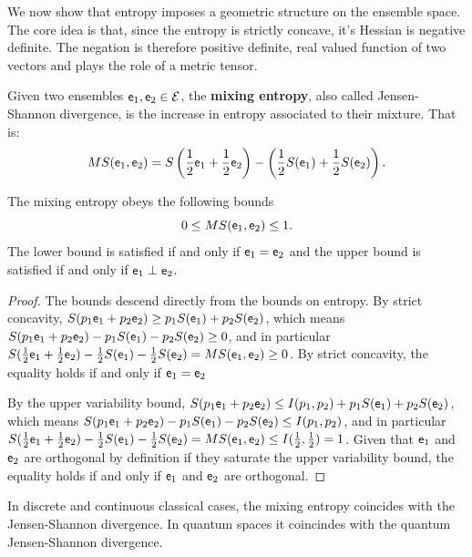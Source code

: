 We now show that entropy imposes a geometric structure on the ensemble space. The core idea is that, since the entropy is strictly concave, it's Hessian is negative definite. The negation is therefore positive definite, real valued function of two vectors and plays the role of a metric tensor.

\begin{defn}
	Given two ensembles $\mathsf{e}_1, \mathsf{e}_2 \in \mathcal{E}$, the \textbf{mixing entropy}, also called Jensen-Shannon divergence, is the increase in entropy associated to their mixture. That is:
	$$MS(\mathsf{e}_1, \mathsf{e}_2) = S\left(\frac{1}{2}\mathsf{e}_1 + \frac{1}{2} \mathsf{e}_2\right) - \left(\frac{1}{2} S(\mathsf{e}_1) + \frac{1}{2} S(\mathsf{e}_2)\right).$$
\end{defn}

\begin{coro}
	The mixing entropy obeys the following bounds
	$$ 0 \leq MS(\mathsf{e}_1, \mathsf{e}_2) \leq 1.$$
	The lower bound is satisfied if and only if $\mathsf{e}_1 = \mathsf{e}_2$ and the upper bound is satisfied if and only if $\mathsf{e}_1 \perp \mathsf{e}_2$.
\end{coro}

\begin{proof}
	The bounds descend directly from the bounds on entropy. By strict concavity, $S(p_1\mathsf{e}_1 + p_2 \mathsf{e}_2) \geq p_1 S(\mathsf{e}_1) + p_2 S(\mathsf{e}_2)$, which means $S(p_1\mathsf{e}_1 + p_2 \mathsf{e}_2) - p_1 S(\mathsf{e}_1) - p_2 S(\mathsf{e}_2) \geq 0$, and in particular $S(\frac{1}{2} \mathsf{e}_1 + \frac{1}{2} \mathsf{e}_2) - \frac{1}{2} S(\mathsf{e}_1) - \frac{1}{2} S(\mathsf{e}_2) = MS(\mathsf{e}_1, \mathsf{e}_2) \geq 0$. By strict concavity, the equality holds if and only if $\mathsf{e}_1 = \mathsf{e}_2$
	
	By the upper variability bound, $S(p_1\mathsf{e}_1 + p_2 \mathsf{e}_2) \leq I(p_1, p_2) + p_1 S(\mathsf{e}_1) + p_2 S(\mathsf{e}_2)$, which means $S(p_1\mathsf{e}_1 + p_2 \mathsf{e}_2) - p_1 S(\mathsf{e}_1) - p_2 S(\mathsf{e}_2) \leq I(p_1, p_2)$, and in particular $S(\frac{1}{2} \mathsf{e}_1 + \frac{1}{2} \mathsf{e}_2) - \frac{1}{2} S(\mathsf{e}_1) - \frac{1}{2} S(\mathsf{e}_2) = MS(\mathsf{e}_1, \mathsf{e}_2) \leq I(\frac{1}{2}, \frac{1}{2}) = 1$. Given that $\mathsf{e}_1$ and $\mathsf{e}_2$ are orthogonal by definition if they saturate the upper variability bound, the equality holds if and only if $\mathsf{e}_1$ and $\mathsf{e}_2$ are orthogonal.
\end{proof}

\begin{prop}
	In discrete and continuous classical cases, the mixing entropy coincides with the Jensen-Shannon divergence. In quantum spaces it coincindes with the quantum Jensen-Shannon divergence.
\end{prop}

